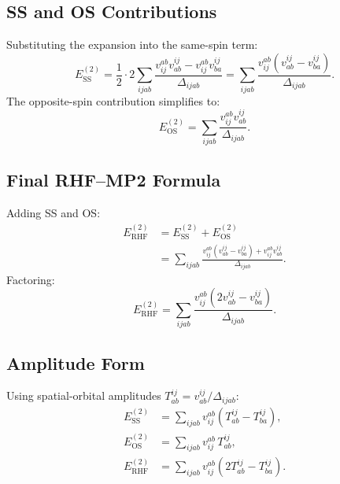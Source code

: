 \documentclass[a4paper,12pt,oneside]{book}
\begin{document}
\subsection{SS and OS Contributions}
Substituting the expansion into the same-spin term:
\begin{equation}
E^{(2)}_{\mathrm{SS}} = \frac{1}{2} \cdot 2 \sum_{ijab} 
  \frac{v_{ij}^{ab}v^{ij}_{ab}  - v_{ij}^{ab}v^{ij}_{ba}}{\Delta_{ijab}}
= \sum_{ijab} \frac{v_{ij}^{ab}(v_{ab}^{ij} - v_{ba}^{ij})}{\Delta_{ijab}}.
\end{equation}
The opposite-spin contribution simplifies to:
\begin{equation}
E^{(2)}_{\mathrm{OS}} = \sum_{ijab} \frac{v_{ij}^{ab}v_{ab}^{ij}}{\Delta_{ijab}}.
\end{equation}

\subsection{Final RHF--MP2 Formula}
Adding SS and OS:
\begin{equation}
\begin{aligned}
E^{(2)}_{\mathrm{RHF}} &= E^{(2)}_{\mathrm{SS}} + E^{(2)}_{\mathrm{OS}} \\[4pt]
&= \sum_{ijab} \frac{v_{ij}^{ab}(v_{ab}^{ij} - v_{ba}^{ij}) 
   + v_{ij}^{ab}v_{ab}^{ij}}{\Delta_{ijab}}.
\end{aligned}
\end{equation}
Factoring:
\begin{equation}
\label{eq:rhf-mp2}
\boxed{E^{(2)}_{\mathrm{RHF}} = \sum_{ijab} 
\frac{v_{ij}^{ab} (2v_{ab}^{ij} - v_{ba}^{ij})}{\Delta_{ijab}}.}
\end{equation}

\subsection{Amplitude Form}
Using spatial-orbital amplitudes $T^{ij}_{ab} = v_{ab}^{ij} / \Delta_{ijab}$:
\begin{equation}
\begin{aligned}
E^{(2)}_{\mathrm{SS}} &= \sum_{ijab} v_{ij}^{ab} (T^{ij}_{ab} - T^{ij}_{ba}), \\
E^{(2)}_{\mathrm{OS}} &= \sum_{ijab} v_{ij}^{ab} \, T^{ij}_{ab}, \\
E^{(2)}_{\mathrm{RHF}} &= \sum_{ijab} v_{ij}^{ab} (2T^{ij}_{ab} - T^{ij}_{ba}).
\end{aligned}
\end{equation}
\end{document}
